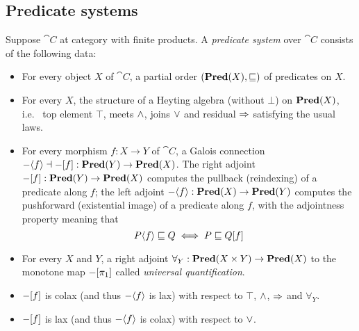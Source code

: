 \subsection{Predicate systems}
\label{sec:predicate-system}

Suppose $\cat{C}$ at category with finite products. A \emph{predicate system} over $\cat{C}$ consists of the
following data:
\begin{itemize}
\item For every object $X$ of $\cat{C}$, a partial order $(\mathbf{Pred}(X), \sqsubseteq)$ of predicates on $X$.
\item For every $X$, the structure of a Heyting algebra (without $\bot$) on $\mathbf{Pred}(X)$, i.e.~ top element
   $\top$, meets $\wedge$, joins $\vee$ and residual $\Rightarrow$ satisfying the usual laws.
\item For every morphism $f: X \to Y$ of $\cat{C}$, a Galois connection $-\langle f\rangle \dashv
-[f] : \mathbf{Pred}(Y) \to \mathbf{Pred}(X)$. The right adjoint $-[f]: \mathbf{Pred}(Y) \to \mathbf{Pred}(X)$ computes
the pullback (reindexing) of a predicate along $f$; the left adjoint $-\langle f\rangle: \mathbf{Pred}(X) \to
\mathbf{Pred}(Y)$ computes the pushforward (existential image) of a predicate along $f$, with the adjointness property
meaning that
\[P\langle f\rangle \sqsubseteq Q \iff P \sqsubseteq Q[f] \]
\item For every $X$ and $Y$, a right adjoint $\forall_Y: \mathbf{Pred}(X \times Y) \to \mathbf{Pred}(X)$ to the monotone map
$-[\pi_1]$ called \emph{universal quantification}. 
\item $-[f]$ is colax (and thus $-\langle f\rangle$ is lax) with respect to $\top$, $\wedge$,
$\Rightarrow$ and $\forall_Y$.
\item $-[f]$ is lax (and thus $-\langle f\rangle$ is colax) with respect to $\vee$.
\end{itemize}
